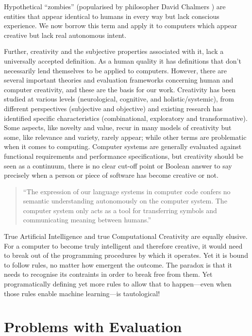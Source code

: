 \begin{leftbar}
Hypothetical ``zombies'' (popularised by philosopher David Chalmers \autocite{Chalmers1996}) are entities that appear identical to humans in every way but lack conscious experience. We now borrow this term and apply it to computers which appear creative but lack real autonomous intent.

Further, creativity and the subjective properties associated with it, lack a universally accepted definition. As a human quality it has definitions that don’t necessarily lend themselves to be applied to computers. However, there are several important theories and evaluation frameworks concerning human and computer creativity, and these are the basis for our work. Creativity has been studied at various levels (neurological, cognitive, and holistic/systemic), from different perspectives (subjective and objective) and existing research has identified specific characteristics (combinational, exploratory and transformative). Some aspects, like novelty and value, recur in many models of creativity but some, like relevance and variety, rarely appear; while other terms are problematic when it comes to computing. Computer systems are generally evaluated against functional requirements and performance specifications, but creativity should be seen as a continuum, there is no clear cut-off point or Boolean answer to say precisely when a person or piece of software has become creative or not.

\begin{quotation}
  ``The expression of our language systems in computer code confers no semantic understanding autonomously on the computer system. The computer system only acts as a tool for transferring symbols and communicating meaning between humans.'' 
\end{quotation}

True Artificial Intelligence and true Computational Creativity are equally elusive. For a computer to become truly intelligent and therefore creative, it would need to break out of the programming procedures by which it operates. Yet it is bound to follow rules, no matter how emergent the outcome. The paradox is that it needs to recognise its contraints in order to break free from them. Yet programatically defining yet more rules to allow that to happen---even when those rules enable machine learning---is tautological!
\end{leftbar}


\section{Problems with Evaluation}

